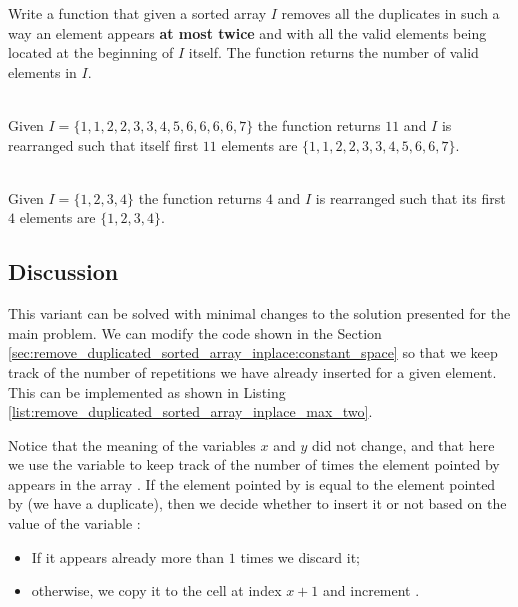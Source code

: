 \begin{exercise}
Write a function that given a sorted array $I$ removes all the 
duplicates in such a way an element appears \textbf{at most twice} and with all the valid elements being located at the beginning of $I$ itself.
The function returns the number of valid elements in $I$.
	
	\label{example:remove_duplicated_sorted_array_inplace:exercice2}
	
		\begin{example}
			\label{example:remove_duplicated_sorted_array_inplace_variation1:example1}
			\hfill \\
			Given $I=\{1,1,2,2,3,3,4,5,6,6,6,6,7\}$ the function returns $11$ and $I$ is rearranged such
			that itself first $11$ elements are $\{1,1,2,2,3,3,4,5,6,6,7\}$.				
		\end{example}
	
		\begin{example}
			\label{example:remove_duplicated_sorted_array_inplace_variation1:example2}
			\hfill \\
			Given $I=\{1,2,3,4\}$ the function returns $4$ and $I$ is rearranged such that its first $4$
			elements are $\{1,2,3,4\}$.	
		\end{example}
\end{exercise}

\subsection{Discussion}

This variant can be solved with minimal changes to the solution presented for the main problem.
We can modify the code shown in the Section \ref{sec:remove_duplicated_sorted_array_inplace:constant_space} so that we keep track of the number of repetitions we have already inserted for a given element.
This can be implemented as shown in Listing \ref{list:remove_duplicated_sorted_array_inplace_max_two}.




Notice that the meaning of the variables $x$ and $y$ did not change, and that here we use the variable  to keep track of the number of times the element pointed by  appears in the array . 
If the element pointed by  is equal to the element pointed by  (we have a duplicate), then we decide whether to insert it or not based on the value of the variable :
\begin{itemize}
	\item If it appears already more than $1$ times we discard it;
	\item otherwise, we copy it to the cell at index $x+1$ and increment .
\end{itemize}

